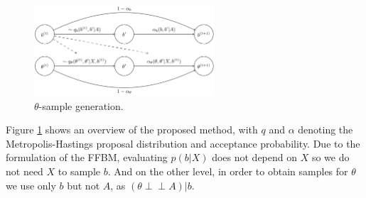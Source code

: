 \begin{figure}[!ht]
	\centering
%		
%		
%		
%		
	\includegraphics[width=0.6\textwidth]{fig/trayfig2}
	\vspace*{-0.1in}
	\caption{$\theta$-sample generation.}
	\label{fig:samp-sequence}
\end{figure}
 
Figure \ref{fig:samp-sequence} shows an overview of the proposed method, with $q$ and $\alpha$ denoting the Metropolis-Hastings proposal distribution and acceptance probability.
Due to the formulation of the FFBM, evaluating $p(b| X)$ does not depend on $X$ so
we do not need $X$ to sample $b$.
And on the other level, in order to obtain 
samples for $\theta$
we use only $b$ but not $A$, as $(\theta \perp \!\!\! \perp A )| b$. 
